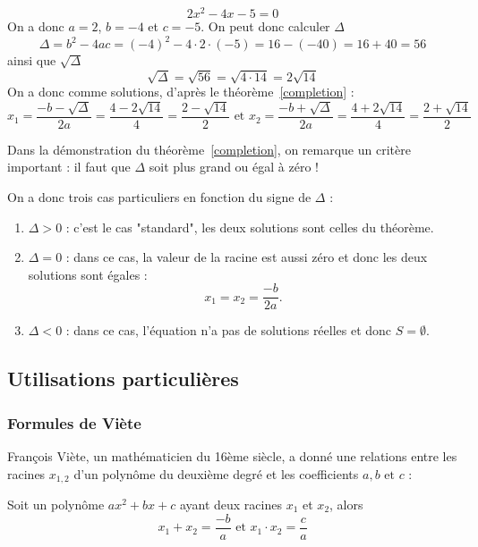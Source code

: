 \begin{exemple}
$$
2x^2 -4x -5 = 0
$$
On a donc $a=2$, $b=-4$ et $c=-5$. On peut donc calculer $\Delta$
$$
\Delta = b^2 -4ac = (-4)^2 -4 \cdot 2 \cdot (-5) = 16 - (-40) = 16+40 = 56
$$
ainsi que $\sqrt{\Delta}$
$$
\sqrt{\Delta} = \sqrt{56} = \sqrt{4\cdot 14} = 2\sqrt{14}
$$
On a donc comme solutions, d'après le théorème~\ref{completion} :
$$
x_1 = \frac{-b-\sqrt{\Delta}}{2a} = \frac{4-2\sqrt{14}}{4} = \frac{2-\sqrt{14}}{2}
\mbox{ et } x_2 = \frac{-b+\sqrt{\Delta}}{2a} = \frac{4+2\sqrt{14}}{4} = \frac{2+\sqrt{14}}{2}
$$
\end{exemple}

\begin{remarque}
Dans la démonstration du théorème~\ref{completion}, on remarque un critère important :
il faut que $\Delta$ soit plus grand ou égal à zéro !

On a donc trois cas particuliers en fonction du signe de $\Delta$ :
\begin{enumerate}
\item $\Delta >0$ : c'est le cas "standard", les deux solutions sont celles du théorème.
\item $\Delta = 0$ : dans ce cas, la valeur de la racine est aussi zéro et donc les deux solutions sont égales :
$$
x_1 = x_2 = \frac{-b}{2a}.
$$
\item $\Delta < 0$ : dans ce cas, l'équation n'a pas de solutions réelles et donc $S=\emptyset$.
\end{enumerate}
\end{remarque}

\subsection{Utilisations particulières}

\subsubsection{Formules de Viète}

François Viète, un mathématicien du 16ème siècle, a donné une relations entre les racines $x_{1,2}$ d'un polynôme du deuxième degré et les coefficients $a,b \mbox{ et } c$ :
\begin{theoreme}\label{viete}
Soit un polynôme $ax^2 + bx + c$ ayant deux racines $x_1$ et $x_2$, alors
$$
x_1 + x_2 = \frac{-b}{a} \mbox{ et } x_1 \cdot x_2 = \frac{c}{a}
$$
\end{theoreme}

